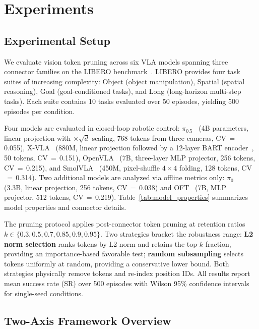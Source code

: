 \section{Experiments}
\label{sec:experiments}

\subsection{Experimental Setup}
\label{sec:exp_setup}

We evaluate vision token pruning across six VLA models spanning three connector families on the LIBERO benchmark~\cite{liu2023libero}. LIBERO provides four task suites of increasing complexity: Object (object manipulation), Spatial (spatial reasoning), Goal (goal-conditioned tasks), and Long (long-horizon multi-step tasks). Each suite contains 10 tasks evaluated over 50 episodes, yielding 500 episodes per condition.

Four models are evaluated in closed-loop robotic control: $\pi_0.5$~\cite{black2025pi05} (4B parameters, linear projection with $\times\!\sqrt{d}$ scaling, 768 tokens from three cameras, CV$\,{=}\,$0.055), X-VLA~\cite{zheng2025xvla} (880M, linear projection followed by a 12-layer BART encoder~\cite{lewis2020bart}, 50 tokens, CV$\,{=}\,$0.151), OpenVLA~\cite{kim2024openvla} (7B, three-layer MLP projector, 256 tokens, CV$\,{=}\,$0.215), and SmolVLA~\cite{shukor2025smolvla} (450M, pixel-shuffle $4{\times}4$ folding, 128 tokens, CV$\,{=}\,$0.314). Two additional models are analyzed via offline metrics only: $\pi_0$~\cite{black2024pi0} (3.3B, linear projection, 256 tokens, CV$\,{=}\,$0.038) and OFT~\cite{kim2025openoft} (7B, MLP projector, 512 tokens, CV$\,{=}\,$0.219). Table~\ref{tab:model_properties} summarizes model properties and connector details.

The pruning protocol applies post-connector token pruning at retention ratios $k \in \{0.3, 0.5, 0.7, 0.85, 0.9, 0.95\}$. Two strategies bracket the robustness range: \textbf{L2 norm selection} ranks tokens by L2 norm and retains the top-$k$ fraction, providing an importance-based favorable test; \textbf{random subsampling} selects tokens uniformly at random, providing a conservative lower bound. Both strategies physically remove tokens and re-index position IDs. All results report mean success rate (SR) over 500 episodes with Wilson 95\% confidence intervals for single-seed conditions.

\subsection{Two-Axis Framework Overview}
\label{sec:two_axis}

